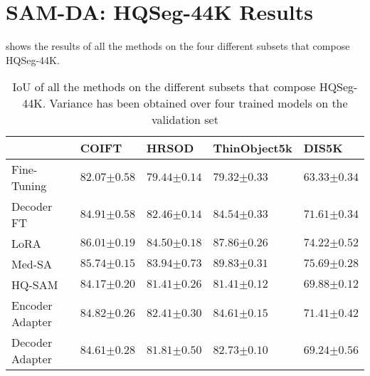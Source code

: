 \section{SAM-DA: HQSeg-44K Results}

 shows the results of all the methods on the four different subsets that compose HQSeg-44K.

\begin{table*}[]
\centering
\caption{IoU of all the methods on the different subsets that compose HQSeg-44K. Variance has been obtained over four trained models on the validation set}
\label{tab:hqseg_results_samda}
\begin{tabular}{@{}lP{2.2cm}P{2.2cm}P{2.2cm}P{2.2cm}@{}}
\toprule
 & COIFT & HRSOD & ThinObject5k & DIS5K \\ \midrule
Fine-Tuning & $82.07{\scriptscriptstyle \pm 0.58}$ & $79.44{\scriptscriptstyle \pm 0.14}$ & $79.32{\scriptscriptstyle \pm 0.33}$ & $63.33{\scriptscriptstyle \pm 0.34}$ \\
Decoder FT & $84.91{\scriptscriptstyle \pm 0.58}$ & $82.46{\scriptscriptstyle \pm 0.14}$ & $84.54{\scriptscriptstyle \pm 0.33}$ & $71.61{\scriptscriptstyle \pm 0.34}$ \\
LoRA & $86.01{\scriptscriptstyle \pm 0.19}$ & $84.50{\scriptscriptstyle \pm 0.18}$ & $87.86{\scriptscriptstyle \pm 0.26}$ & $74.22{\scriptscriptstyle \pm 0.52}$ \\
Med-SA & $85.74{\scriptscriptstyle \pm 0.15}$ & $83.94{\scriptscriptstyle \pm 0.73}$ & $89.83{\scriptscriptstyle \pm 0.31}$ & $75.69{\scriptscriptstyle \pm 0.28}$ \\
HQ-SAM & $84.17{\scriptscriptstyle \pm 0.20}$ & $81.41{\scriptscriptstyle \pm 0.26}$ & $81.41{\scriptscriptstyle \pm 0.12}$ & $69.88{\scriptscriptstyle \pm 0.12}$ \\ \midrule
Encoder Adapter & $84.82{\scriptscriptstyle \pm 0.26}$ & $82.41{\scriptscriptstyle \pm 0.30}$ & $84.61{\scriptscriptstyle \pm 0.15}$ & $71.41{\scriptscriptstyle \pm 0.42}$ \\
Decoder Adapter & $84.61{\scriptscriptstyle \pm 0.28}$ & $81.81{\scriptscriptstyle \pm 0.50}$ & $82.73{\scriptscriptstyle \pm 0.10}$ & $69.24{\scriptscriptstyle \pm 0.56}$ \\ \bottomrule
\end{tabular}

\end{table*}